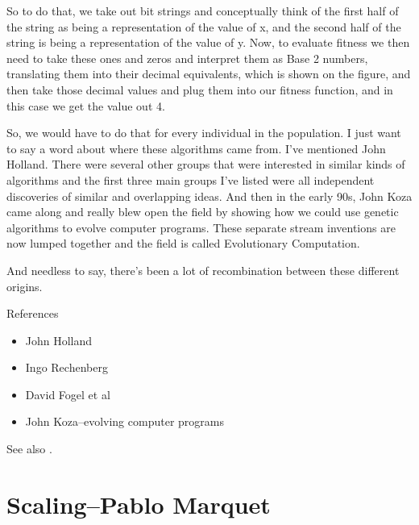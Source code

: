 \documentclass[]{article}
\begin{document}
So to do that, we take out bit strings and
conceptually think of the first half of the
string as being a representation of the
value of x, and the second half of the string
is being a representation of the value of y.
Now, to evaluate fitness we then need to
take these ones and zeros and interpret
them as Base 2 numbers, translating them
into their decimal equivalents, which is
shown on the figure, and then take those
decimal values and plug them into our
fitness function, and in this case we get
the value out 4.

So, we would have to do that for every
individual in the population.
I just want to say a word about where
these algorithms came from. I've mentioned
John Holland. There were several other
groups that were interested in similar
kinds of algorithms and the first three main
groups I've listed were all independent
discoveries of similar and overlapping ideas.
And then in the early 90s, John Koza\cite{koza1992genetic} came along
and really blew open the field by showing
how we could use genetic algorithms to
evolve computer programs.
These separate stream inventions are now
lumped together and the field is called
Evolutionary Computation.

And needless to say, there's been
a lot of recombination between these
different origins.


References

\begin{itemize}
	\item John Holland \cite{holland1992adaptation}
	\item Ingo Rechenberg \cite{rechenberg1965cybernetic}
	\item David Fogel et al\cite{fogel1998artificial}
	\item John Koza--evolving computer programs\cite{koza1992genetic}
\end{itemize}

See also \cite{mitchell1998introduction,eiben2003introduction,forrest1993genetic,ma2014novo}.

\section[Scaling]{Scaling--Pablo Marquet}
\end{document}

